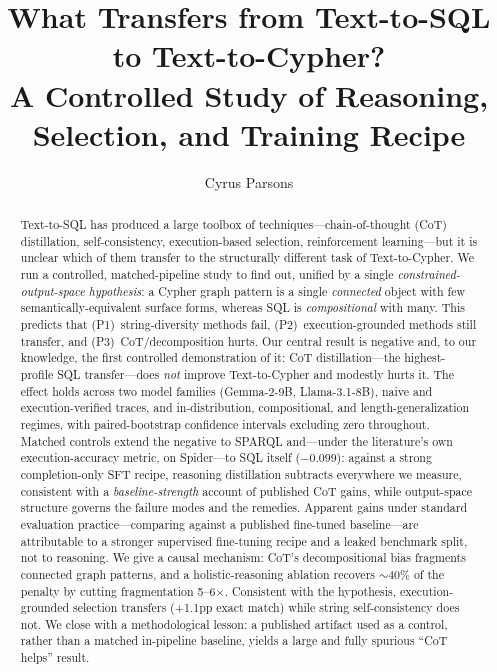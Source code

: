 \documentclass[11pt]{article}
\title{What Transfers from Text-to-SQL to Text-to-Cypher?\\A Controlled Study of Reasoning, Selection, and Training Recipe}
\author{Cyrus Parsons}
\date{}
\begin{document}
\maketitle

\begin{abstract}
Text-to-SQL has produced a large toolbox of techniques---chain-of-thought (CoT) distillation,
self-consistency, execution-based selection, reinforcement learning---but it is unclear which of
them transfer to the structurally different task of Text-to-Cypher. We run a controlled,
matched-pipeline study to find out, unified by a single \emph{constrained-output-space hypothesis}:
a Cypher graph pattern is a single \emph{connected} object with few semantically-equivalent surface
forms, whereas SQL is \emph{compositional} with many. This predicts that (P1)~string-diversity
methods fail, (P2)~execution-grounded methods still transfer, and (P3)~CoT/decomposition hurts.
Our central result is negative and, to our knowledge, the first controlled demonstration of it: CoT
distillation---the highest-profile SQL transfer---does \emph{not} improve Text-to-Cypher and
modestly hurts it. The effect holds across two model families (Gemma-2-9B, Llama-3.1-8B), naive and
execution-verified traces, and in-distribution, compositional, and length-generalization regimes,
with paired-bootstrap confidence intervals excluding zero throughout. Matched controls extend the
negative to SPARQL and---under the literature's own execution-accuracy metric, on Spider---to SQL
itself ($-0.099$): against a strong completion-only SFT recipe, reasoning distillation subtracts
everywhere we measure, consistent with a \emph{baseline-strength} account of published CoT gains,
while output-space structure governs the failure modes and the remedies.
Apparent gains under standard evaluation practice---comparing against a published fine-tuned
baseline---are attributable to a stronger supervised fine-tuning recipe and a leaked benchmark
split, not to reasoning. We give a causal mechanism: CoT's
decompositional bias fragments connected graph patterns, and a holistic-reasoning ablation recovers
$\sim$40\% of the penalty by cutting fragmentation 5--6$\times$. Consistent with the hypothesis,
execution-grounded selection transfers (+1.1pp exact match) while string self-consistency does not.
We close with a methodological lesson: a published artifact used as a control, rather than a matched
in-pipeline baseline, yields a large and fully spurious ``CoT helps'' result.
\end{abstract}
\end{document}
